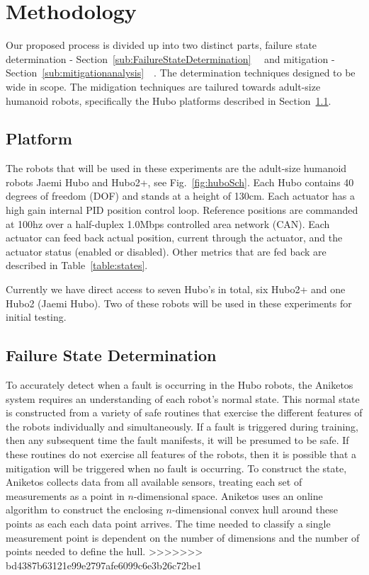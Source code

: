 \section{Methodology}

Our proposed process is divided up into two distinct parts, failure state 
determination - Section~\ref{sub:FailureStateDetermination}~~ and mitigation - Section~\ref{sub:mitigationanalysis}~~.  The determination techniques designed to be 
wide in scope.  The midigation techniques are tailured towards adult-size
humanoid robots, specifically the Hubo platforms described in Section~\ref{sec:platform}.

 
\subsection{Platform}\label{sec:platform}
The robots that will be used in these experiments are the adult-size 
humanoid robots Jaemi Hubo and Hubo2+, see Fig.~\ref{fig:huboSch}.  
Each Hubo contains 40 degrees of freedom (DOF) and stands at a height of 130cm.
Each actuator has a high gain internal PID position control loop.  Reference positions are
commanded at 100hz over a half-duplex 1.0Mbps controlled area network (CAN).
Each actuator can feed back actual position, current through the actuator, and the actuator status 
(enabled or disabled).  Other metrics that are fed back are described in 
Table~\ref{table:states}.  

Currently we have direct access to seven Hubo's in total, six Hubo2+ and one Hubo2 (Jaemi Hubo).
Two of these robots will be used in these experiments for initial testing.



\subsection{Failure State Determination}
\label{sub:failurestatedetermination}
To accurately detect when a fault is occurring in the Hubo robots, the Aniketos system requires an understanding of each robot's normal state. This normal state is constructed from a variety of safe routines that exercise the different features of the robots individually and simultaneously. If a fault is triggered during training, then any subsequent time the fault manifests, it will be presumed to be safe. If these routines do not exercise all features of the robots, then it is possible that a mitigation will be triggered when no fault is occurring. To construct the state, Aniketos collects data from all available sensors, treating each set of measurements as a point in $n$-dimensional space. Aniketos uses an online algorithm to construct the enclosing $n$-dimensional convex hull around these points as each each data point arrives. The time needed to classify a single measurement point is dependent on the number of dimensions and the number of points needed to define the hull.
>>>>>>> bd4387b63121e99e2797afe6099c6e3b26c72be1

